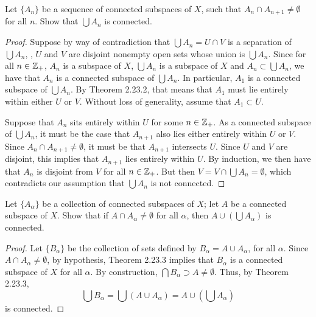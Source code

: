 \begin{exercise}[ID=3.23.2]
  Let $\{A_n\}$ be a sequence of connected subspaces of $X$, such that $A_n \cap A_{n+1} \neq \emptyset$ for all $n$.
  Show that $\bigcup A_n$ is connected.
\end{exercise}
%
\begin{solution}
  \begin{proof}
    Suppose by way of contradiction that $\bigcup A_n = U \cap V$ is a separation of $\bigcup A_n$, \ie, $U$ and $V$ are disjoint nonempty open sets whose union is $\bigcup A_n$.
    Since for all $n \in \mathbb{Z}_+$, $A_n$ is a subspace of $X$, $\bigcup A_n$ is a subspace of $X$ and $A_n \subset \bigcup A_n$, we have that $A_n$ is a connected subspace of $\bigcup A_n$.
    In particular, $A_1$ is a connected subspace of $\bigcup A_n$.
    By Theorem 2.23.2, that means that $A_1$ must lie entirely within either $U$ or $V$.
    Without loss of generality, assume that $A_1 \subset U$.

    Suppose that $A_n$ sits entirely within $U$ for some $n \in \mathbb{Z}_+$.
    As a connected subspace of $\bigcup A_n$, it must be the case that $A_{n+1}$ also lies either entirely within $U$ or $V$.
    Since $A_n \cap A_{n+1} \neq \emptyset$, it must be that $A_{n+1}$ intersects $U$.
    Since $U$ and $V$ are disjoint, this implies that $A_{n+1}$ lies entirely within $U$.
    By induction, we then have that $A_n$ is disjoint from $V$ for all $n \in \mathbb{Z}_+$.
    But then $V = V \cap \bigcup A_n = \emptyset$, which contradicts our assumption that $\bigcup A_n$ is not connected.
  \end{proof}
\end{solution}
\newpage

\begin{exercise}[ID=3.23.3]
  Let $\{A_\alpha\}$ be a collection of connected subspaces of $X$;
  let $A$ be a connected subspace of $X$.
  Show that if $A \cap A_\alpha \neq \emptyset$ for all $\alpha$, then $A \cup \left(\bigcup A_\alpha\right)$ is connected.
\end{exercise}
%
\begin{solution}
  \begin{proof}
    Let $\{B_\alpha\}$ be the collection of sets defined by $B_\alpha = A \cup A_\alpha$, for all $\alpha$.
    Since $A \cap A_\alpha \neq \emptyset$, by hypothesis, Theorem 2.23.3 implies that $B_\alpha$ is a connected subspace of $X$ for all $\alpha$.
    By construction, $\bigcap B_\alpha \supset A \neq \emptyset$.
    Thus, by Theorem 2.23.3,
    \begin{equation*}
      \bigcup B_\alpha = \bigcup \left(A \cup A_\alpha\right) = A \cup \left(\bigcup A_\alpha\right)
    \end{equation*}
    is connected.
  \end{proof}
\end{solution}
\newpage


